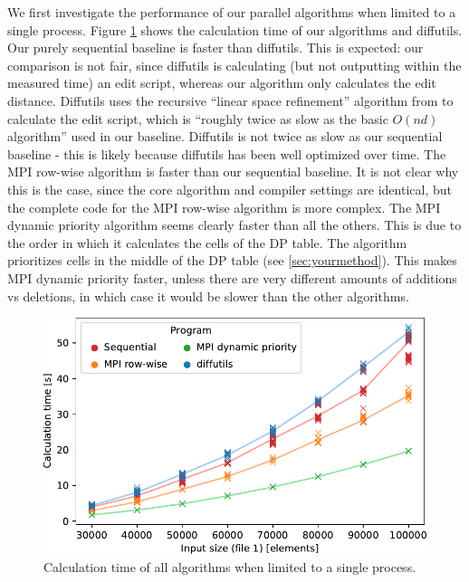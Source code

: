 We first investigate the performance of our parallel algorithms when limited to a single process. Figure \ref{results_sequential_comparison} shows the calculation time of our algorithms and diffutils. Our purely sequential baseline is faster than diffutils. This is expected: our comparison is not fair, since diffutils is calculating (but not outputting within the measured time) an edit script, whereas our algorithm only calculates the edit distance. Diffutils uses the recursive ``linear space refinement'' algorithm from \cite{myers_anond_1986} to calculate the edit script, which is ``roughly twice as slow as the basic $O(nd)$ algorithm'' \cite{myers_anond_1986} used in our baseline. Diffutils is not twice as slow as our sequential baseline - this is likely because diffutils has been well optimized over time. The MPI row-wise algorithm is faster than our sequential baseline. It is not clear why this is the case, since the core algorithm and compiler settings are identical, but the complete code for the MPI row-wise algorithm is more complex. The MPI dynamic priority algorithm seems clearly faster than all the others. This is due to the order in which it calculates the cells of the DP table. The algorithm prioritizes cells in the middle of the DP table (see \ref{sec:yourmethod}). This makes MPI dynamic priority faster, unless there are very different amounts of additions vs deletions, in which case it would be slower than the other algorithms.

\begin{figure}[hbt]\centering
  \includegraphics[width=\linewidth]{images/sequential-comparison.pdf}
  \caption{Calculation time of all algorithms when limited to a single process.}
  \label{results_sequential_comparison}
\end{figure}


